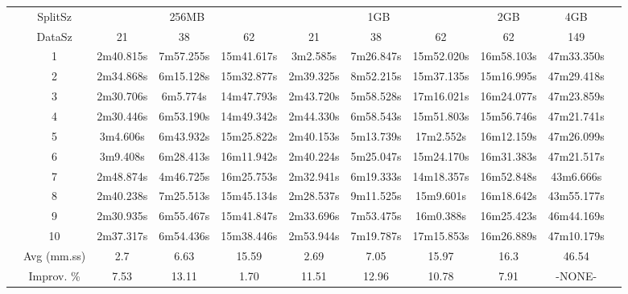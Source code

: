 \begin{tabularx}{\linewidth}{c|c|c|c|c|c|c|c|c|c|l|}
\cline{2-10}
& SplitSz 
& \multicolumn{3}{c|}{256MB} & \multicolumn{3}{c|}{1GB}  & \multicolumn{1}{c|}{2GB} & \multicolumn{1}{c|}{4GB} \\
\cline{2-10}
& DataSz 
& 21 & 38 & 62 & 21 & 38 & 62 & 62 & 149 \\
\cline{2-10}
& 1
& 2m40.815s & 7m57.255s & 15m41.617s & 3m2.585s & 7m26.847s & 15m52.020s & 16m58.103s & 47m33.350s \\
\cline{2-10}
& 2
& 2m34.868s & 6m15.128s & 15m32.877s & 2m39.325s & 8m52.215s & 15m37.135s & 15m16.995s & 47m29.418s \\
\cline{2-10}
& 3
& 2m30.706s & 6m5.774s & 14m47.793s & 2m43.720s & 5m58.528s & 17m16.021s & 16m24.077s & 47m23.859s \\
\cline{2-10}
& 4
& 2m30.446s & 6m53.190s & 14m49.342s & 2m44.330s & 6m58.543s & 15m51.803s & 15m56.746s & 47m21.741s \\
\cline{2-10}
& 5
& 3m4.606s & 6m43.932s & 15m25.822s & 2m40.153s & 5m13.739s & 17m2.552s & 16m12.159s & 47m26.099s \\
\cline{2-10}
& 6
& 3m9.408s & 6m28.413s & 16m11.942s & 2m40.224s & 5m25.047s & 15m24.170s & 16m31.383s & 47m21.517s \\
\cline{2-10}
& 7
& 2m48.874s & 4m46.725s & 16m25.753s & 2m32.941s & 6m19.333s & 14m18.357s & 16m52.848s & 43m6.666s \\
\cline{2-10}
& 8
& 2m40.238s & 7m25.513s & 15m45.134s & 2m28.537s & 9m11.525s & 15m9.601s & 16m18.642s & 43m55.177s \\
\cline{2-10}
& 9
& 2m30.935s & 6m55.467s & 15m41.847s & 2m33.696s & 7m53.475s & 16m0.388s & 16m25.423s & 46m44.169s \\
\cline{2-10}
& 10
& 2m37.317s & 6m54.436s & 15m38.446s & 2m53.944s & 7m19.787s & 17m15.853s & 16m26.889s & 47m10.179s \\
\cline{2-10}
& Avg (mm.ss)
& 2.7 & 6.63 & 15.59 & 2.69 & 7.05 & 15.97 & 16.3 & 46.54 \\
\cline{2-10}
& Improv. \%
& 7.53 & 13.11 & 1.70 & 11.51 & 12.96 & 10.78 & 7.91 & -NONE- \\
\cline{2-10}
\end{tabularx}

